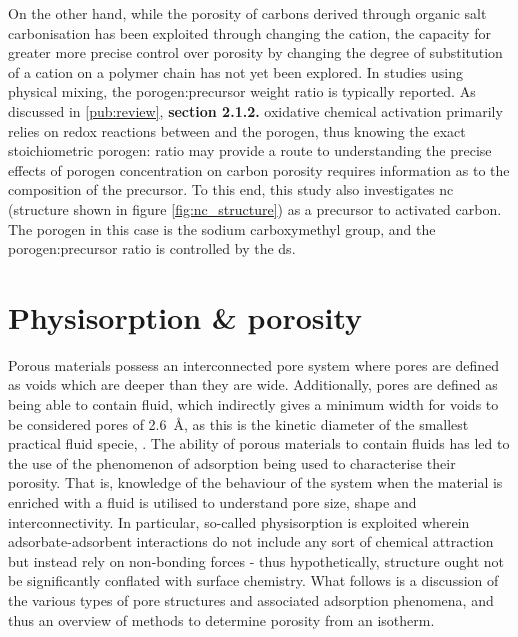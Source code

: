 On the other hand, while the porosity of carbons derived through organic salt carbonisation has been exploited through changing the cation,\citep{Sevilla2013general, Tsumura2014Structure, Ferrero2015Mesoporous, Ferrero2016Efficient, Fuertes2015Hierarchical, Roberts2015Hierarchically, Yadav20123D, Yang2018Spontaneous} the capacity for greater more precise control over porosity by changing the degree of substitution of a cation on a polymer chain has not yet been explored. In studies using physical mixing, the \gls{porogen}:precursor weight ratio is typically reported.\citep{Altwala2020Predictable, Adeniran2015Compactivation, Blankenship2017Cigarette, Sevilla2016green, Ludwinowicz2015Potassium, Deng2015Inspired, Alhamed2015Preparation, Hu2003simple} As discussed in \ref{pub:review}, \textbf{section 2.1.2.} oxidative chemical activation primarily relies on redox reactions between  and the \gls{porogen}, thus knowing the exact stoichiometric  \gls{porogen}: ratio may provide a route to understanding the precise effects of \gls{porogen} concentration on carbon porosity requires information as to the composition of the precursor. To this end, this study also investigates \acrfull{nc} (structure shown in figure \ref{fig:nc_structure}) as a precursor to activated carbon. The \gls{porogen} in this case is the sodium carboxymethyl group, and the \gls{porogen}:precursor ratio is controlled by the \acrfull{ds}.

\section{Physisorption \& porosity}
\label{s:adsorption_porosity}
Porous materials possess an interconnected pore system where pores are defined as voids which are deeper than they are wide.\citep{mcnaught1997compendium, Thommes2015Physisorption} Additionally, pores are defined as being able to contain fluid, which indirectly gives a minimum width for voids to be considered pores of \qty{2.6}{\angstrom}, as this is the kinetic diameter of the smallest practical fluid specie, .\citep{Thommes2015Physisorption, Lide2007Handbook} The ability of porous materials to contain fluids has led to the use of the phenomenon of adsorption being used to characterise their porosity. That is, knowledge of the behaviour of the system when the material is enriched with a fluid is utilised to understand pore size, shape and interconnectivity. In particular, so-called \gls{physisorption} is exploited wherein \gls{adsorbate}-\gls{adsorbent} interactions do not include any sort of chemical attraction but instead rely on non-bonding forces\citep{Thommes2015Physisorption} - thus hypothetically, structure ought not be significantly conflated with surface chemistry. What follows is a discussion of the various types of pore structures and associated adsorption phenomena, and thus an overview of methods to determine porosity from an isotherm.

